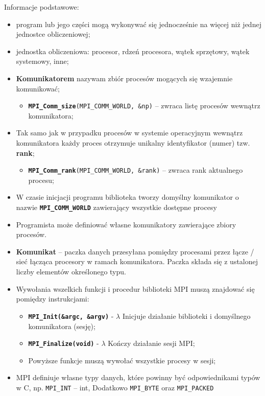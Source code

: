 Informacje podstawowe: 
\begin{itemize}
\item program lub jego części mogą wykonywać się jednocześnie na więcej niż jednej jednostce obliczeniowej;
\item jednostka obliczeniowa: procesor, rdzeń procesora, wątek sprzętowy, wątek systemowy, inne;
\item \textbf{Komunikatorem} nazywam zbiór procesów mogących się wzajemnie komunikować;
\begin{itemize}
\item \texttt{\textbf{MPI\_Comm\_size}(MPI\_COMM\_WORLD, \&np)} -- zwraca listę procesów wewnątrz komunikatora;
\end{itemize}
\item Tak samo jak w przypadku procesów w systemie operacyjnym wewnątrz komunikatora każdy proces otrzymuje unikalny identyfikator (numer) tzw. \textbf{rank};
\begin{itemize}
\item \texttt{\textbf{MPI\_Comm\_rank}(MPI\_COMM\_WORLD, \&rank)} -- zwraca rank aktualnego procesu;
\end{itemize}
\item W czasie inicjacji programu biblioteka tworzy domyślny komunikator o nazwie \texttt{\textbf{MPI\_COMM\_WORLD}} zawierający wszystkie dostępne procesy
\item Programista może definiować własne komunikatory zawierające zbiory procesów.
\item \textbf{Komunikat} -- paczka danych przesyłana pomiędzy procesami przez łącze / sieć łącząca procesory w ramach komunikatora. Paczka składa się z ustalonej liczby elementów określonego typu.
\item Wywołania wszelkich funkcji i procedur biblioteki MPI muszą znajdować się pomiędzy instrukcjami:
\begin{itemize}
\item \texttt{\textbf{MPI\_Init(\&argc, \&argv)}} - $\lambda$ Inicjuje działanie biblioteki i domyślnego komunikatora (sesję);
\item \texttt{\textbf{MPI\_Finalize(void)}} - $\lambda$ Kończy działanie sesji MPI;
\item Powyższe funkcje muszą wywołać wszystkie procesy w sesji;
\end{itemize}
\item MPI definiuje własne typy danych, które powinny być odpowiednikami typów w C, np. \texttt{MPI\_INT} -- int, Dodatkowo \texttt{MPI\_BYTE} oraz \texttt{MPI\_PACKED}
\end{itemize}

